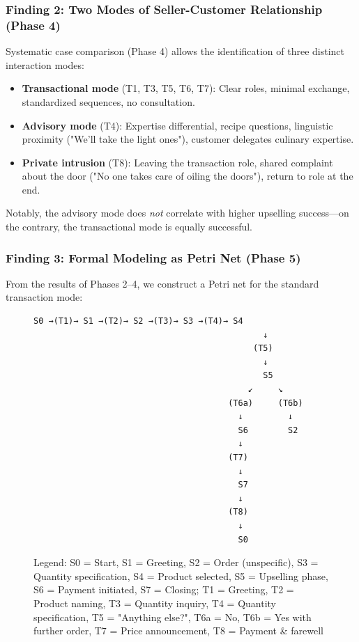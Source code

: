 \documentclass[12pt,a4paper]{article}
\begin{document}
\subsubsection{Finding 2: Two Modes of Seller-Customer Relationship (Phase 4)}

Systematic case comparison (Phase 4) allows the identification of three distinct interaction modes:

\begin{itemize}
    \item \textbf{Transactional mode} (T1, T3, T5, T6, T7): Clear roles, minimal exchange, standardized sequences, no consultation.
    \item \textbf{Advisory mode} (T4): Expertise differential, recipe questions, linguistic proximity ("We'll take the light ones"), customer delegates culinary expertise.
    \item \textbf{Private intrusion} (T8): Leaving the transaction role, shared complaint about the door ("No one takes care of oiling the doors"), return to role at the end.
\end{itemize}

Notably, the advisory mode does \textit{not} correlate with higher upselling success—on the contrary, the transactional mode is equally successful.

\subsubsection{Finding 3: Formal Modeling as Petri Net (Phase 5)}

From the results of Phases 2–4, we construct a Petri net for the standard transaction mode:

\begin{figure}[H]
\centering
\caption{Petri net of the standard market transaction}
\begin{verbatim}
S0 →(T1)→ S1 →(T2)→ S2 →(T3)→ S3 →(T4)→ S4
                                              ↓
                                            (T5)
                                              ↓
                                              S5
                                           ↙     ↘
                                       (T6a)     (T6b)
                                         ↓         ↓
                                         S6        S2
                                         ↓
                                       (T7)
                                         ↓
                                         S7
                                         ↓
                                       (T8)
                                         ↓
                                         S0
\end{verbatim}
\caption*{Legend: S0 = Start, S1 = Greeting, S2 = Order (unspecific), S3 = Quantity specification, S4 = Product selected, S5 = Upselling phase, S6 = Payment initiated, S7 = Closing; T1 = Greeting, T2 = Product naming, T3 = Quantity inquiry, T4 = Quantity specification, T5 = "Anything else?", T6a = No, T6b = Yes with further order, T7 = Price announcement, T8 = Payment \& farewell}
\end{figure}
\end{document}
